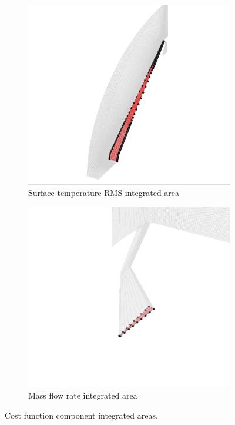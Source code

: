\begin{figure}[h]
  \centering
	\begin{subfigure}[b]{0.4\textwidth}
    \centering
    \includegraphics[width=\textwidth]{figures/surface2.png}
    \caption{Surface temperature RMS integrated area}
    \label{fig:t-rms-area}
  \end{subfigure}
	\begin{subfigure}[b]{0.4\textwidth}
    \centering
    \includegraphics[width=\textwidth]{figures/plenum_bc.png}
    \caption{Mass flow rate integrated area}
    \label{fig:plenum-face}
  \end{subfigure}
  \caption{Cost function component integrated areas.}
  \label{fig:cost-func-integrated-areas}
\end{figure}

